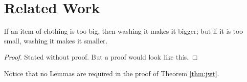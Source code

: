 \chapter{Related Work}



\begin{thm}
\label{thm:jwt}
If an item of clothing is too big, then washing it makes it bigger;
but if it is too small, washing it makes it smaller.
\end{thm}
\begin{proof}
Stated without proof. But a proof would look like this. 
\end{proof}

Notice that no Lemmas are required in the proof of Theorem \ref{thm:jwt}.
